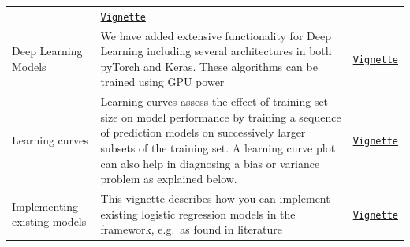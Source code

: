 \documentclass[
]{article}
\begin{document}
\begin{longtable}[]{@{}lll@{}}
\begin{minipage}[t]{0.55\columnwidth}
\end{minipage} & \begin{minipage}[t]{0.18\columnwidth}\raggedright
\href{https://github.com/OHDSI/PatientLevelPrediction/blob/master/inst/doc/BuildingEnsembleModels.pdf}{\texttt{Vignette}}\strut
\end{minipage}\tabularnewline
\begin{minipage}[t]{0.18\columnwidth}\raggedright
Deep Learning Models\strut
\end{minipage} & \begin{minipage}[t]{0.55\columnwidth}\raggedright
We have added extensive functionality for Deep Learning including
several architectures in both pyTorch and Keras. These algorithms can be
trained using GPU power\strut
\end{minipage} & \begin{minipage}[t]{0.18\columnwidth}\raggedright
\href{https://github.com/OHDSI/PatientLevelPrediction/blob/master/inst/doc/BuildingDeepLearningModels.pdf}{\texttt{Vignette}}\strut
\end{minipage}\tabularnewline
\begin{minipage}[t]{0.18\columnwidth}\raggedright
Learning curves\strut
\end{minipage} & \begin{minipage}[t]{0.55\columnwidth}\raggedright
Learning curves assess the effect of training set size on model
performance by training a sequence of prediction models on successively
larger subsets of the training set. A learning curve plot can also help
in diagnosing a bias or variance problem as explained below.\strut
\end{minipage} & \begin{minipage}[t]{0.18\columnwidth}\raggedright
\href{https://github.com/OHDSI/PatientLevelPrediction/blob/master/inst/doc/GeneratingLearningCurves.pdf}{\texttt{Vignette}}\strut
\end{minipage}\tabularnewline
\begin{minipage}[t]{0.18\columnwidth}\raggedright
Implementing existing models\strut
\end{minipage} & \begin{minipage}[t]{0.55\columnwidth}\raggedright
This vignette describes how you can implement existing logistic
regression models in the framework, e.g.~as found in literature\strut
\end{minipage} & \begin{minipage}[t]{0.18\columnwidth}\raggedright
\href{https://github.com/OHDSI/PatientLevelPrediction/blob/master/inst/doc/ImplementingExistingModels.pdf}{\texttt{Vignette}}\strut
\end{minipage}\tabularnewline
\bottomrule
\end{longtable}
\end{document}
